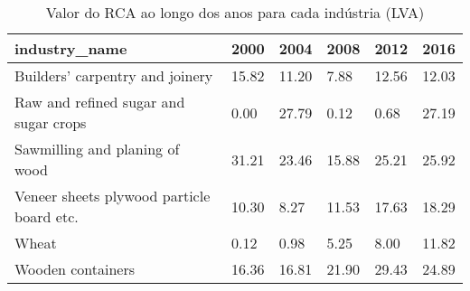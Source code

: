 \begin{table}
\centering
\caption{Valor do RCA ao longo dos anos para cada indústria (LVA)}
\begin{tabular}{p{6cm}p{1.5cm}p{1.5cm}p{1.5cm}p{1.5cm}p{1.5cm}}
\toprule
                            industry\_name &  2000 &  2004 &  2008 &  2012 &  2016 \\
\midrule
          Builders' carpentry and joinery & 15.82 & 11.20 &  7.88 & 12.56 & 12.03 \\
    Raw and refined sugar and sugar crops &  0.00 & 27.79 &  0.12 &  0.68 & 27.19 \\
           Sawmilling and planing of wood & 31.21 & 23.46 & 15.88 & 25.21 & 25.92 \\
Veneer sheets plywood particle board etc. & 10.30 &  8.27 & 11.53 & 17.63 & 18.29 \\
                                    Wheat &  0.12 &  0.98 &  5.25 &  8.00 & 11.82 \\
                        Wooden containers & 16.36 & 16.81 & 21.90 & 29.43 & 24.89 \\
\bottomrule
\end{tabular}
\end{table}
